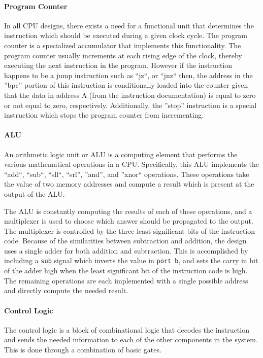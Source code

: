 \documentclass[11pt,letterpaper,final]{article}
\begin{document}
\paragraph{ Program Counter }
In all CPU designs, there exists a need for a functional unit that determines the
instruction which should be executed during a given clock cycle. The program counter
is a specialized accumulator that implements this functionality.  The program counter
usually increments at each rising edge of the clock, thereby executing the
next instruction in the program.  However if the instruction happens to be a jump
instruction such as ``jz``, or ``jnz`` then, the address in the ''bpc'' portion
of this instruction is conditionally loaded into the counter given that the data
in address A (from the instruction documentation) is equal to zero or
not equal to zero, respectively.  Additionally, the ''stop'' instruction is a special instruction
which stops the program counter from incrementing.
\paragraph{ ALU }
An arithmetic logic unit or ALU is a computing element that performs the
various mathematical operations in a CPU.  Specifically, this ALU implements the
``add``, ``sub``, ``sll``, ``srl'', ''and'', and ''xnor`` operations.  These
operations take the value of two memory addresses and compute a result which is
present at the output of the ALU.  

The ALU is constantly computing the results of each of these operations, and a
multiplexer is used to choose which answer should be propagated to the output. 
The multiplexer is controlled by the three least significant bits of the instruction
code. Because of the similarities between subtraction and addition, the design
uses a single adder for both addition and subtraction.  This is accomplished by
including a \verb|sub| signal which inverts the value in \verb|port b|, and sets the carry in
bit of the adder high when the least significant bit of the instruction code is
high.  The remaining operations are each implemented with a single possible
address and directly compute the needed result.

\paragraph{ Control Logic }
The control logic is a block of combinational logic that decodes the
instruction and sends the needed information to each of the other components in
the system.  This is done through a combination of basic gates.
\end{document}
